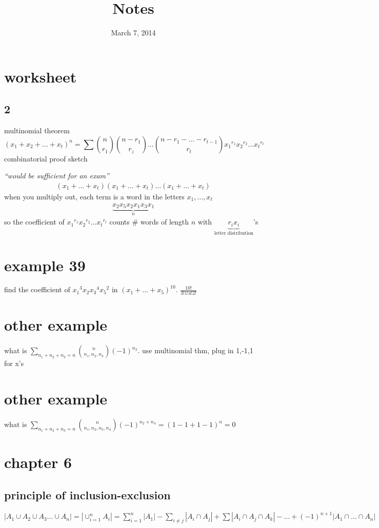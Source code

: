 \documentclass{article}
\newcommand{\abs}[1]{\left\lvert #1 \right\rvert}
\begin{document}
\title{Notes}
\date{March 7, 2014}
\maketitle
\section*{worksheet}
\subsection*{2}
multinomial theorem
\[(x_1+x_2+\dots+x_t)^n=\sum\limits{\binom{n}{r_1}\binom{n-r_1}{r_z}\dots\binom{n-r_1-\dots-r_{t-1}}{r_t}{x_1}^{r_1}{x_2}^{r_2}\dots{x_t}^{r_t}}\]
combinatorial proof sketch

\emph{``would be sufficient for an exam''}
\begin{align*}
  (x_1+\dots+x_t)(x_1+\dots+x_t)\dots(x_1+\dots+x_t)
\end{align*}
when you multiply out, each term is a word in the letters $x_1,\dots,x_t$
\begin{align*}
  \underbrace{x_2x_5x_2x_1x_3x_1}_n
\end{align*}
so the coefficient of ${x_1}^{r_1}{x_2}^{r_2}\dots{x_t}^{r_t}$ counts \# words of length $n$ with $\underbrace{r_ix_i}_{\text{letter distribution}}$'s
\section*{example 39}
find the coefficient of ${x_1}^3x_2{x_3}^4{x_5}^2$ in $(x_1+\dots+x_5)^{10}$. $\frac{10!}{3!1!4!2!}$
\section*{other example}
what is $\sum\limits_{n_1+n_2+n_3=n}{\binom{n}{n_1,n_2,n_3}(-1)^{n_2}}$. use multinomial thm, plug in 1,-1,1 for x's
\section*{other example}
what is $\sum\limits_{n_1+n_2+n_3=n}{\binom{n}{n_1,n_2,n_3,n_4}(-1)^{n_2+n_4}}=(1-1+1-1)^n=0$
\section*{chapter 6}
\subsection*{principle of inclusion-exclusion}
$\abs{A_1\cup A_2\cup A_3\dots\cup A_n}=\abs{\cup_{i=1}^n{A_i}}=\sum\limits_{i=1}^n{\abs{A_1}}-\sum\limits_{i\ne j}{\abs{A_i\cap A_j}}+\sum\limits{\abs{A_i\cap A_j\cap A_k}}-\dots+(-1)^{n+1}\abs{A_1\cap\dots\cap A_n}$
\end{document}
